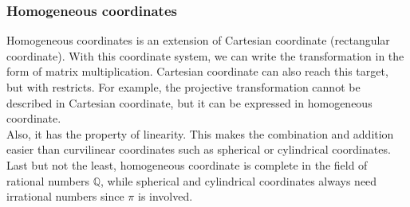 \subsubsection{Homogeneous coordinates}
Homogeneous coordinates is an extension of Cartesian coordinate (rectangular coordinate).
With this coordinate system, we can write the transformation in the form of matrix multiplication.
Cartesian coordinate can also reach this target, but with restricts.
For example, the projective transformation cannot be described in Cartesian coordinate, but it can be expressed in homogeneous coordinate.\\
Also, it has the property of linearity.
This makes the combination and addition easier than curvilinear coordinates such as spherical or cylindrical coordinates.\\
Last but not the least, homogeneous coordinate is complete in the field of rational numbers \(\mathbb{Q}\), while spherical and cylindrical coordinates always need irrational numbers since \(\pi\) is involved.


